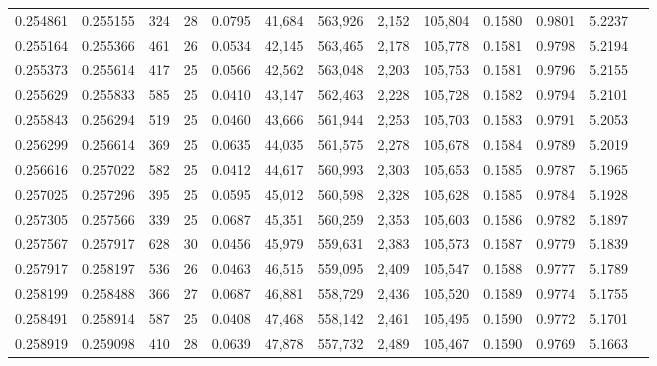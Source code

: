 \begin{tabular}{rrrrrrrrrrrrr}
0.254861 & 0.255155 & 324 &  28 &                                     0.0795 &  41,684 & 563,926 &   2,152 & 105,804 & 0.1580 & 0.9801 & 5.2237 \\
0.255164 & 0.255366 & 461 &  26 &                                     0.0534 &  42,145 & 563,465 &   2,178 & 105,778 & 0.1581 & 0.9798 & 5.2194 \\
0.255373 & 0.255614 & 417 &  25 &                                     0.0566 &  42,562 & 563,048 &   2,203 & 105,753 & 0.1581 & 0.9796 & 5.2155 \\
0.255629 & 0.255833 & 585 &  25 &                                     0.0410 &  43,147 & 562,463 &   2,228 & 105,728 & 0.1582 & 0.9794 & 5.2101 \\
0.255843 & 0.256294 & 519 &  25 &                                     0.0460 &  43,666 & 561,944 &   2,253 & 105,703 & 0.1583 & 0.9791 & 5.2053 \\
0.256299 & 0.256614 & 369 &  25 &                                     0.0635 &  44,035 & 561,575 &   2,278 & 105,678 & 0.1584 & 0.9789 & 5.2019 \\
0.256616 & 0.257022 & 582 &  25 &                                     0.0412 &  44,617 & 560,993 &   2,303 & 105,653 & 0.1585 & 0.9787 & 5.1965 \\
0.257025 & 0.257296 & 395 &  25 &                                     0.0595 &  45,012 & 560,598 &   2,328 & 105,628 & 0.1585 & 0.9784 & 5.1928 \\
0.257305 & 0.257566 & 339 &  25 &                                     0.0687 &  45,351 & 560,259 &   2,353 & 105,603 & 0.1586 & 0.9782 & 5.1897 \\
0.257567 & 0.257917 & 628 &  30 &                                     0.0456 &  45,979 & 559,631 &   2,383 & 105,573 & 0.1587 & 0.9779 & 5.1839 \\
0.257917 & 0.258197 & 536 &  26 &                                     0.0463 &  46,515 & 559,095 &   2,409 & 105,547 & 0.1588 & 0.9777 & 5.1789 \\
0.258199 & 0.258488 & 366 &  27 &                                     0.0687 &  46,881 & 558,729 &   2,436 & 105,520 & 0.1589 & 0.9774 & 5.1755 \\
0.258491 & 0.258914 & 587 &  25 &                                     0.0408 &  47,468 & 558,142 &   2,461 & 105,495 & 0.1590 & 0.9772 & 5.1701 \\
0.258919 & 0.259098 & 410 &  28 &                                     0.0639 &  47,878 & 557,732 &   2,489 & 105,467 & 0.1590 & 0.9769 & 5.1663 \\

\end{tabular}

